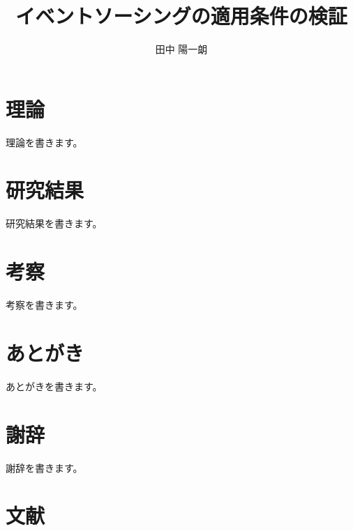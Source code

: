 \documentclass[dvipdfmx,uplatex,a4paper,10.5pt,oneside,onecolumn,openany]{jsbook}
\title{イベントソーシングの適用条件の検証}
\author{田中 陽一朗}
\begin{document}
    
    
    

    \chapter{理論}\label{ch:theory}

    理論を書きます。

    \clearpage

    \chapter{研究結果}\label{ch:result}

    研究結果を書きます。

    \clearpage

    \chapter{考察}\label{ch:consideration}

    考察を書きます。

    \clearpage

    \chapter{あとがき}\label{ch:conclusion}

    あとがきを書きます。

    \clearpage

    \chapter{謝辞}\label{ch:acknowledgement}

    謝辞を書きます。

    \clearpage

    \chapter{文献}\label{ch:reference}
\end{document}
